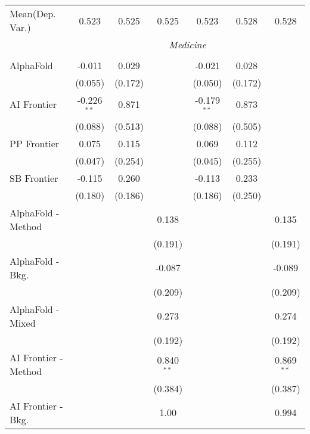 \begin{tabular}{lcccccc}
Mean(Dep. Var.) & 0.523 & 0.525 & 0.525 & 0.523 & 0.528 & 0.528 \\
 & \multicolumn{6}{c}{\textit{Medicine}} \\ \\
   AlphaFold            & -0.011        & 0.029   &              & -0.021        & 0.028   &   \\   
                        & (0.055)       & (0.172) &              & (0.050)       & (0.172) &   \\   
   AI Frontier          & -0.226$^{**}$ & 0.871   &              & -0.179$^{**}$ & 0.873   &   \\   
                        & (0.088)       & (0.513) &              & (0.088)       & (0.505) &   \\   
   PP Frontier          & 0.075         & 0.115   &              & 0.069         & 0.112   &   \\   
                        & (0.047)       & (0.254) &              & (0.045)       & (0.255) &   \\   
   SB Frontier          & -0.115        & 0.260   &              & -0.113        & 0.233   &   \\   
                        & (0.180)       & (0.186) &              & (0.186)       & (0.250) &   \\   
   AlphaFold - Method   &               &         & 0.138        &               &         & 0.135\\   
                        &               &         & (0.191)      &               &         & (0.191)\\   
   AlphaFold - Bkg.     &               &         & -0.087       &               &         & -0.089\\   
                        &               &         & (0.209)      &               &         & (0.209)\\   
   AlphaFold - Mixed    &               &         & 0.273        &               &         & 0.274\\   
                        &               &         & (0.192)      &               &         & (0.192)\\   
   AI Frontier - Method &               &         & 0.840$^{**}$ &               &         & 0.869$^{**}$\\   
                        &               &         & (0.384)      &               &         & (0.387)\\   
   AI Frontier - Bkg.   &               &         & 1.00         &               &         & 0.994\\   

\end{tabular}
